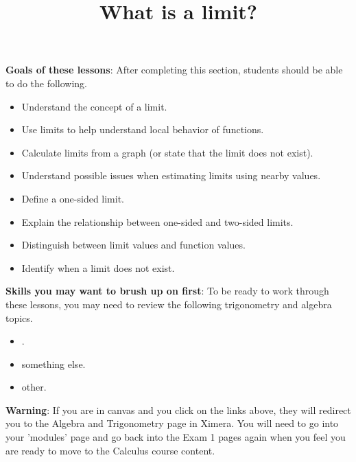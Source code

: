 \documentclass{ximera}
\title{What is a limit?}
\begin{document}
\begin{abstract}
\end{abstract}

\maketitle

\begin{sectionOutcomes}
\textbf{Goals of these lessons}: After completing this section, students should be able to do the following.

\begin{itemize}
	\item Understand the concept of a limit.
    \item Use limits to help understand local behavior of functions.
	\item Calculate limits from a graph (or state that the limit does not exist).
	\item Understand possible issues when estimating limits using
          nearby values.
	\item Define a one-sided limit.
	\item Explain the relationship between one-sided and two-sided limits.
	\item Distinguish between limit values and function values.
	\item Identify when a limit does not exist.
\end{itemize}
\end{sectionOutcomes}



\textbf{Skills you may want to brush up on first}: To be ready to work
through these lessons, you may need to review the following trigonometry and algebra topics.
\begin{itemize}
    \item {}.%
    \item something else.
    \item other.
\end{itemize}

\textbf{Warning}: If you are in canvas and you click on the links above, they will redirect you
to the Algebra and Trigonometry page in Ximera. You will need to
go into your 'modules' page and go back into the Exam 1 pages again
when you feel you are ready to move to the Calculus course content.
\end{document}
